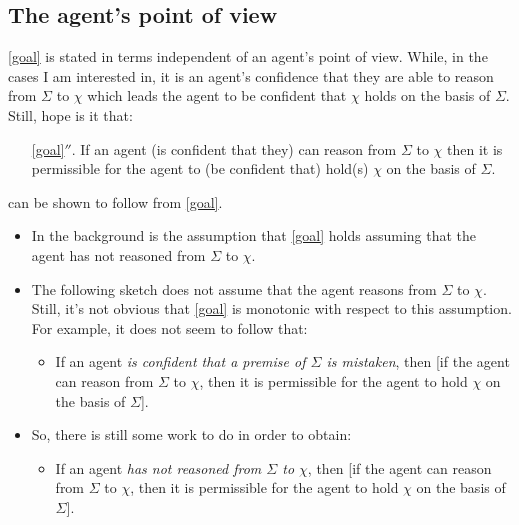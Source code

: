 \documentclass[10pt]{article}
\newcommand{\hozlinedash}[0]{%
  \noindent\hdashrule[0.5ex][c]{\textwidth}{.1pt}{2.5pt}
}
\begin{document}
\subsection{The agent's point of view}
\label{sec:point-view}

\ref{goal} is stated in terms independent of an agent's point of view.
While, in the cases I am interested in, it is an agent's confidence that they are able to reason from \(\Sigma\) to \(\chi\) which leads the agent to be confident that \(\chi\) holds on the basis of \(\Sigma\).
Still, hope is it that:

\begin{enumerate}
\item[\ref{goal}\(''\).] If an agent (is confident that they) can reason from \(\Sigma\) to \(\chi\) then it is permissible for the agent to (be confident that) hold(s) \(\chi\) on the basis of \(\Sigma\).
\end{enumerate}

can be shown to follow from \ref{goal}.

\begin{itemize}
\item In the background is the assumption that \ref{goal} holds assuming that the agent has not reasoned from \(\Sigma\) to \(\chi\).
\item The following sketch does not assume that the agent reasons from \(\Sigma\) to \(\chi\).
  Still, it's not obvious that \ref{goal} is monotonic with respect to this assumption.
  For example, it does not seem to follow that:
  \begin{itemize}
  \item If an agent \emph{is confident that a premise of \(\Sigma\) is mistaken}, then [if the agent can reason from \(\Sigma\) to \(\chi\), then it is permissible for the agent to hold \(\chi\) on the basis of \(\Sigma\)].
  \end{itemize}
\item So, there is still some work to do in order to obtain:
  \begin{itemize}
  \item If an agent \emph{has not reasoned from \(\Sigma\) to \(\chi\)}, then [if the agent can reason from \(\Sigma\) to \(\chi\), then it is permissible for the agent to hold \(\chi\) on the basis of \(\Sigma\)].
  \end{itemize}
\end{itemize}

\hozlinedash

\newpage
\end{document}
